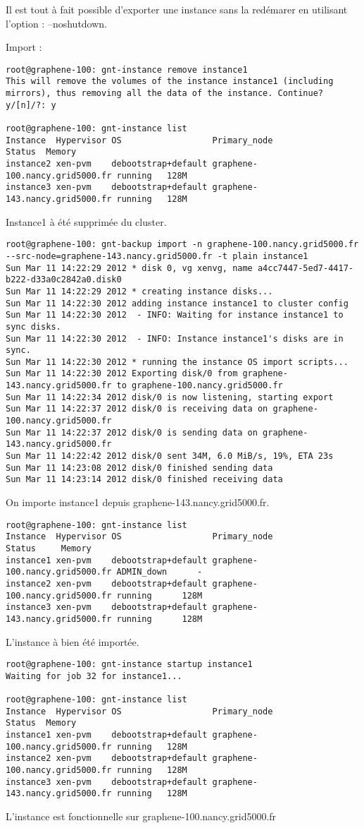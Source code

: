 Il est tout à fait possible d'exporter une instance sans la redémarer en utilisant l'option : --noshutdown.

Import :
\begin{lstlisting}
root@graphene-100: gnt-instance remove instance1
This will remove the volumes of the instance instance1 (including
mirrors), thus removing all the data of the instance. Continue?
y/[n]/?: y

root@graphene-100: gnt-instance list
Instance  Hypervisor OS                  Primary_node                   Status  Memory
instance2 xen-pvm    debootstrap+default graphene-100.nancy.grid5000.fr running   128M
instance3 xen-pvm    debootstrap+default graphene-143.nancy.grid5000.fr running   128M
\end{lstlisting}
Instance1 à été supprimée du cluster.
\begin{lstlisting}
root@graphene-100: gnt-backup import -n graphene-100.nancy.grid5000.fr --src-node=graphene-143.nancy.grid5000.fr -t plain instance1
Sun Mar 11 14:22:29 2012 * disk 0, vg xenvg, name a4cc7447-5ed7-4417-b222-d33a0c2842a0.disk0
Sun Mar 11 14:22:29 2012 * creating instance disks...
Sun Mar 11 14:22:30 2012 adding instance instance1 to cluster config
Sun Mar 11 14:22:30 2012  - INFO: Waiting for instance instance1 to sync disks.
Sun Mar 11 14:22:30 2012  - INFO: Instance instance1's disks are in sync.
Sun Mar 11 14:22:30 2012 * running the instance OS import scripts...
Sun Mar 11 14:22:30 2012 Exporting disk/0 from graphene-143.nancy.grid5000.fr to graphene-100.nancy.grid5000.fr
Sun Mar 11 14:22:34 2012 disk/0 is now listening, starting export
Sun Mar 11 14:22:37 2012 disk/0 is receiving data on graphene-100.nancy.grid5000.fr
Sun Mar 11 14:22:37 2012 disk/0 is sending data on graphene-143.nancy.grid5000.fr
Sun Mar 11 14:22:42 2012 disk/0 sent 34M, 6.0 MiB/s, 19%, ETA 23s
Sun Mar 11 14:23:08 2012 disk/0 finished sending data
Sun Mar 11 14:23:14 2012 disk/0 finished receiving data
\end{lstlisting}
On importe instance1 depuis graphene-143.nancy.grid5000.fr.
\begin{lstlisting}
root@graphene-100: gnt-instance list
Instance  Hypervisor OS                  Primary_node                   Status     Memory
instance1 xen-pvm    debootstrap+default graphene-100.nancy.grid5000.fr ADMIN_down      -
instance2 xen-pvm    debootstrap+default graphene-100.nancy.grid5000.fr running      128M
instance3 xen-pvm    debootstrap+default graphene-143.nancy.grid5000.fr running      128M
\end{lstlisting}
L'instance à bien été importée.
\begin{lstlisting}
root@graphene-100: gnt-instance startup instance1
Waiting for job 32 for instance1...

root@graphene-100: gnt-instance list
Instance  Hypervisor OS                  Primary_node                   Status  Memory
instance1 xen-pvm    debootstrap+default graphene-100.nancy.grid5000.fr running   128M
instance2 xen-pvm    debootstrap+default graphene-100.nancy.grid5000.fr running   128M
instance3 xen-pvm    debootstrap+default graphene-143.nancy.grid5000.fr running   128M
\end{lstlisting}
L'instance est fonctionnelle sur graphene-100.nancy.grid5000.fr


